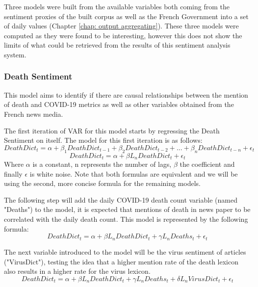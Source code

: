 Three models were built from the available variables both coming from the sentiment proxies of the built corpus as well as the French Government into a set of daily values (Chapter \ref{chap: output aggregating}). These three models were computed as they were found to be interesting, however this does not show the limits of what could be retrieved from the results of this sentiment analysis system.

\subsubsection{Death Sentiment}

This model aims to identify if there are causal relationships between the mention of death and COVID-19 metrics as well as other variables obtained from the French news media.

The first iteration of VAR for this model starts by regressing the Death Sentiment on itself. The model for this first iteration is as follows:
\begin{equation}
    DeathDict_{t} = \alpha + \beta_{1}DeathDict_{t-1} + \beta_{2}DeathDict_{t-2} + ... + \beta_{n}DeathDict_{t-n} + \epsilon_{t}
\end{equation}
\begin{equation}
    DeathDict_{t} = \alpha + \beta L_{n} DeathDict_{t} + \epsilon_{t}
\end{equation}
Where $\alpha$ is a constant, n represents the number of lags, $\beta$ the coefficient and finally $\epsilon$ is white noise. Note that both formulas are equivalent and we will be using the second, more concise formula for the remaining models.

The following step will add the daily COVID-19 death count variable (named "Deaths") to the model, it is expected that mentions of death in news paper to be correlated with the daily death count. This model is represented by the following formula:
\begin{equation}
    DeathDict_{t} = \alpha + \beta L_{n} DeathDict_{t} + \gamma L_{n} Deaths_{t} + \epsilon_{t}
\end{equation}

The next variable introduced to the model will be the virus sentiment of articles ("VirusDict"), testing the idea that a higher mention rate of the death lexicon also results in a higher rate for the virus lexicon.
\begin{equation}
    DeathDict_{t} = \alpha + \beta L_{n} DeathDict_{t} + \gamma L_{n} Deaths_{t} + \delta L_{n} VirusDict_{t} + \epsilon_{t}
\end{equation}

